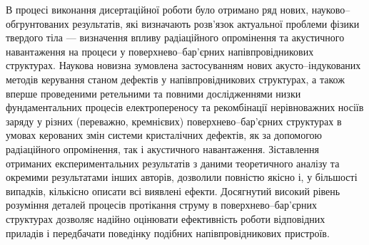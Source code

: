 {\noveltyTXT}
В процесі виконання дисертаційної роботи було отримано ряд нових, науково--обгрунтованих
результатів, які
визначають розв'язок актуальної проблеми фізики твердого тіла ---
визначення впливу радіаційного опромінення та акустичного навантаження на процеси у поверхнево--бар'єрних напівпровідникових структурах.
Наукова новизна зумовлена застосуванням нових акусто--індукованих методів керування станом дефектів у напівпровідникових структурах, а також вперше проведеними ретельними та повними дослідженнями низки фундаментальних процесів електропереносу та рекомбінації нерівноважних носіїв заряду у різних (переважно, кремнієвих) поверхнево--бар'єрних структурах в умовах керованих змін системи кристалічних дефектів, як за допомогою радіаційного опромінення, так і акустичного навантаження.
Зіставлення отриманих експериментальних результатів з даними теоретичного аналізу та окремими результатами інших авторів, дозволили повністю якісно і, у більшості випадків, кількісно описати всі виявлені ефекти.
Досягнутий високий рівень розуміння деталей процесів протікання струму в поверхнево--бар'єрних структурах дозволяє надійно оцінювати ефективність роботи відповідних приладів і передбачати поведінку подібних напівпровідникових пристроїв.
